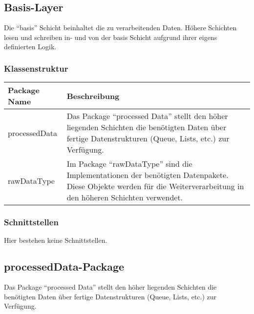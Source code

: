 \documentclass[a4,12pt]{scrartcl}
\begin{document}
\subsection{Basis-Layer}
Die “basis” Schicht beinhaltet die zu verarbeitenden Daten. Höhere Schichten lesen und schreiben in- und von der basis Schicht aufgrund ihrer eigens definierten Logik. 
\subsubsection{Klassenstruktur}
\begin{table}[H]
\centering
    \begin{tabular}{@{}l p{11cm} @{}}\toprule    
    {Package Name} & {Beschreibung}\\ \midrule
     processedData& Das Package “processed Data” stellt den höher liegenden Schichten die benötigten Daten über fertige Datenstrukturen (Queue, Lists, etc.) zur Verfügung. \\ \addlinespace
     rawDataType& Im Package “rawDataType” sind die Implementationen der benötigten Datenpakete. Diese Objekte werden für die Weiterverarbeitung in den höheren Schichten verwendet. \\ 
    \bottomrule
    \end{tabular}
\end{table}
\subsubsection{Schnittstellen}
Hier bestehen keine Schnittstellen.

\subsection{processedData-Package}
Das Package “processed Data” stellt den höher liegenden Schichten die benötigten Daten über fertige Datenstrukturen (Queue, Lists, etc.) zur Verfügung. 
\end{document}

